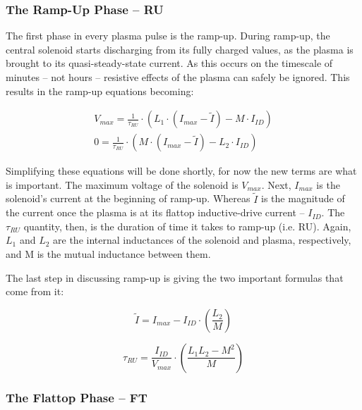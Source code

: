 
\subsubsection{The Ramp-Up Phase -- RU}

The first phase in every plasma pulse is the ramp-up. During ramp-up, the central solenoid starts discharging from its fully charged values, as the plasma is brought to its quasi-steady-state current. As this occurs on the timescale of minutes -- not hours -- resistive effects of the plasma can safely be ignored. This results in the ramp-up equations becoming:

\begin{align}
	V_{max} = \frac{1}{\tau_{RU}} \cdot \left( L_1 \cdot ( I_{max} - \tilde I ) - M \cdot I_{ID} \right) \\
	0 = \frac{1}{\tau_{RU}} \cdot \left( M \cdot ( I_{max} - \tilde I ) - L_2 \cdot I_{ID} \right)
\end{align}

Simplifying these equations will be done shortly, for now the new terms are what is important. The maximum voltage of the solenoid is $V_{max}$. Next, $I_{max}$ is the solenoid's current at the beginning of ramp-up. Whereas $\tilde I$ is the magnitude of the current once the plasma is at its flattop inductive-drive current -- $I_{ID}$. The $\tau_{RU}$ quantity, then, is the duration of time it takes to ramp-up (i.e. RU). Again, $L_1$ and $L_2$ are the internal inductances of the solenoid and plasma, respectively, and M is the mutual inductance between them.

The last step in discussing ramp-up is giving the two important formulas that come from it:

\begin{equation}
	\label{eq:itilde}
	\tilde I = I_{max} - I_{ID} \cdot \left( \frac{L_2}{M} \right)
\end{equation}

\begin{equation}
	\label{eq:tauru}
	\tau_{RU} = \frac{I_{ID}}{V_{max}} \cdot \left( \frac{ L_1 L_2 - M^2 }{ M } \right)
\end{equation}

\subsubsection{The Flattop Phase -- FT}

